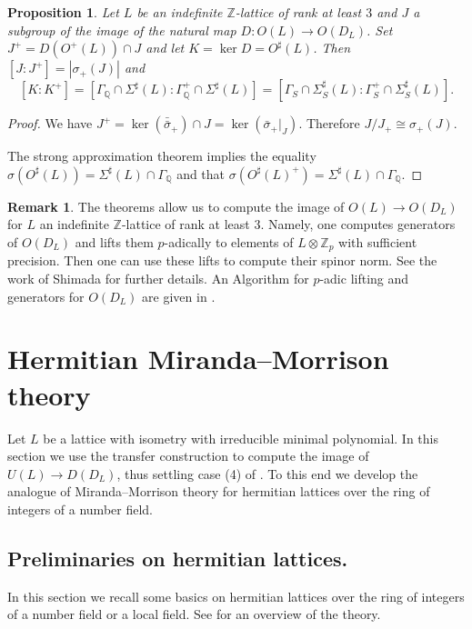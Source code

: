\documentclass[a4paper]{amsart}
\theoremstyle{definition}
\newtheorem{remark}[definition]{Remark}
\theoremstyle{plain}
\newtheorem{proposition}[definition]{Proposition}
\newcommand{\QQ}{\mathbb{Q}}
\newcommand{\ZZ}{\mathbb{Z}}
\newcommand{\disc}[1]{{D_{#1}}}
\begin{document}
\begin{proposition}\label{plusindexcompute}
 Let $L$ be an indefinite $\ZZ$-lattice of rank at least $3$ and $J$ a subgroup of the image of the natural map $D \colon O(L) \to O(\disc{L})$. Set $J^+ = D(O^+(L)) \cap J$ and let $K = \ker D=O^\sharp(L)$.
 Then $[J:J^+]=| \sigma_+(J)|$ and \[[K:K^+]= [\Gamma_\QQ \cap \Sigma^\sharp(L): \Gamma_\QQ^+ \cap \Sigma^\sharp(L)] =
 [\Gamma_S \cap \Sigma^\sharp_S(L): \Gamma_S^+ \cap \Sigma^\sharp_S(L)].\]
\end{proposition}
\begin{proof}
We have $J^+ = \ker (\bar \bar \sigma_+) \cap J = \ker (\bar \sigma_+|_J)$.
Therefore $J/J_+ \cong \sigma_+(J)$.

The strong approximation theorem implies the equality
$\sigma(O^\sharp(L)) = \Sigma^\sharp(L) \cap \Gamma_\QQ$ and that
$\sigma(O^\sharp(L)^+) = \Sigma^\sharp(L) \cap \Gamma_\QQ$.
%
%
%
%
%
%
%
%
%
%
%
%
%
%
%
%
%
%
%
%
%
%
\end{proof}


\begin{remark}
 The theorems allow us to compute the image of $O(L) \to O(D_L)$ for $L$
 an indefinite $\ZZ$-lattice of rank at least $3$. Namely, one computes generators of $O(D_L)$ and lifts them $p$-adically to elements of $L\otimes \ZZ_p$ with sufficient precision. Then one can use these lifts to compute their spinor norm. See the work of Shimada \cite{shimada2018} for further details. An Algorithm for $p$-adic lifting and generators for $O(D_L)$ are given in \cite{brandhorst-veniani2023}.
\end{remark}

\section{Hermitian Miranda--Morrison theory}\label{hermitianmm}
Let $L$ be a lattice with isometry with irreducible minimal polynomial.
In this section we use the transfer construction to compute the image of
$U(L) \to D(\disc{L})$, thus settling case (4) of .  To this end we develop the analogue of Miranda--Morrison theory for hermitian lattices over the ring of integers of a number field.

\subsection{Preliminaries on hermitian lattices.}
In this section we recall some basics on hermitian lattices over the ring of integers of a number field or a local field. See \cite{KirschmerHabil} for an overview of the theory.
\end{document}
